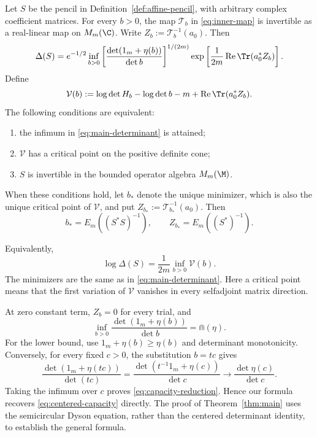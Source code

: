 \begin{theorem}\label{thm:main}
Let $S$ be the pencil in Definition~\ref{def:affine-pencil}, with arbitrary complex coefficient matrices.
For every $b>0$, the map $\mathcal T_b$ in \eqref{eq:inner-map} is invertible as a real-linear map on $M_m(\C)$.
Write $Z_b:=\mathcal T_b^{-1}(a_0)$.
Then
\begin{equation}\label{eq:main-determinant}
 \Delta(S)=e^{-1/2}\inf_{b>0}
 \left[\frac{\det(1_m+\eta(b))}{\det b}\right]^{1/(2m)}
 \exp\left[\frac1{2m}\operatorname{Re}\Tr(a_0^*Z_b)\right].
\end{equation}
Define
\begin{equation}\label{eq:main-action}
 \mathcal V(b):=\log\det H_b-\log\det b-m
                 +\operatorname{Re}\Tr(a_0^*Z_b).
\end{equation}
The following conditions are equivalent:
\begin{enumerate}
\renewcommand{\labelenumi}{(\roman{enumi})}
\item the infimum in \eqref{eq:main-determinant} is attained;
\item $\mathcal V$ has a critical point on the positive definite cone;
\item $S$ is invertible in the bounded operator algebra $M_m(\M)$.
\end{enumerate}
When these conditions hold, let $b_*$ denote the unique minimizer, which is also the unique critical point of $\mathcal V$, and put $Z_{b_*}:=\mathcal T_{b_*}^{-1}(a_0)$.
Then
\begin{equation}\label{eq:main-optimizer}
 b_*=E_m((S^*S)^{-1}),\qquad Z_{b_*}=E_m((S^*)^{-1}).
\end{equation}
\end{theorem}

Equivalently,
\[
 \log\Delta(S)=\frac1{2m}\inf_{b>0}\mathcal V(b).
\]
The minimizers are the same as in \eqref{eq:main-determinant}.
Here a critical point means that the first variation of $\mathcal V$ vanishes in every selfadjoint matrix direction.

At zero constant term, $Z_b=0$ for every trial, and
\begin{equation}\label{eq:capacity-reduction}
 \inf_{b>0}\frac{\det(1_m+\eta(b))}{\det b}=\Cap(\eta).
\end{equation}
For the lower bound, use $1_m+\eta(b)\ge\eta(b)$ and determinant monotonicity.
Conversely, for every fixed $c>0$, the substitution $b=tc$ gives
\[
 \frac{\det(1_m+\eta(tc))}{\det(tc)}
   =\frac{\det(t^{-1}1_m+\eta(c))}{\det c}
   \longrightarrow\frac{\det\eta(c)}{\det c}.
\]
Taking the infimum over $c$ proves \eqref{eq:capacity-reduction}.
Hence our formula recovers \eqref{eq:centered-capacity} directly.
The proof of Theorem~\ref{thm:main} uses the semicircular Dyson equation, rather than the centered determinant identity, to establish the general formula.

